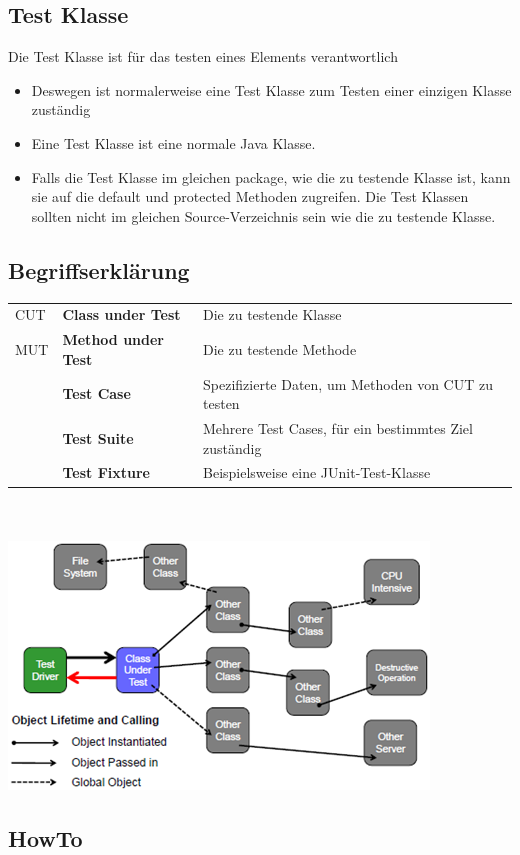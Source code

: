 \documentclass[a4paper,10pt]{article}
\newcommand{\Bold}[1]{\textbf{#1}} %
\begin{document}
\subsection{Test Klasse}
Die Test Klasse ist f\"{u}r das testen eines Elements verantwortlich
\begin{itemize}
	\item Deswegen ist normalerweise eine Test Klasse zum Testen einer einzigen Klasse zust\"{a}ndig
	\item Eine Test Klasse ist eine normale Java Klasse.
	\item Falls die Test Klasse im gleichen package, wie die zu testende Klasse ist, kann sie auf die default und protected Methoden zugreifen. Die Test Klassen sollten nicht im gleichen Source-Verzeichnis sein wie die zu testende Klasse.
\end{itemize}

\subsection{Begriffserkl\"{a}rung}
\begin{tabular}{lll}
CUT&\Bold {Class under Test}&Die zu testende Klasse\\
MUT&\Bold {Method under Test}&Die zu testende Methode\\
&\Bold {Test Case}&Spezifizierte Daten, um Methoden von CUT zu testen\\
&\Bold {Test Suite}&Mehrere Test Cases, f\"{u}r ein bestimmtes Ziel zust\"{a}ndig\\
&\Bold {Test Fixture}&Beispielsweise eine JUnit-Test-Klasse\\
\end{tabular}\\ \\
\includegraphics[scale=1]{Begriffe.png}

\subsection{HowTo}
\end{document}
